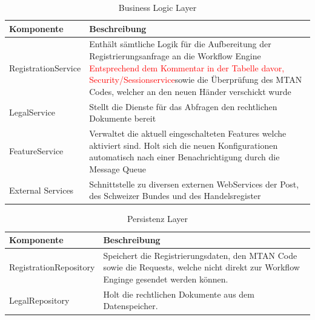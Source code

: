 \begin{table}[H]
	\centering
	\caption{Business Logic Layer}
	\begin{tabular}{ | p{4cm} | p{12cm} | }
		\toprule
		{\textbf{Komponente}} & {\textbf{Beschreibung}} \\
		\midrule
		RegistrationService &  Enthält sämtliche Logik für die Aufbereitung der Registrierungsanfrage an die Workflow Engine \textcolor{red}{Entsprechend dem Kommentar in der Tabelle davor, Security/Sessionservice}sowie die Überprüfung des MTAN Codes, welcher an den neuen Händer verschickt wurde\\ \hline
		LegalService &  Stellt die Dienste für das Abfragen den rechtlichen Dokumente bereit \\ \hline
		FeatureService &  Verwaltet die aktuell eingeschalteten Features welche aktiviert sind. Holt sich die neuen Konfigurationen automatisch nach einer Benachrichtigung durch die Message Queue \\ \hline
		External Services & Schnittstelle zu diversen externen WebServices der Post, des Schweizer Bundes und des Handelsregister \\
		\bottomrule
	\end{tabular}
\end{table}

\begin{table}[H]
	\centering
	\caption{Persistenz Layer}
	\begin{tabular}{ | p{4cm} | p{12cm} | }
		\toprule
		{\textbf{Komponente}} & {\textbf{Beschreibung}} \\
		\midrule
		RegistrationRepository &  Speichert die Registrierungsdaten, den MTAN Code sowie die Requests, welche nicht direkt zur Workflow Enginge gesendet werden können. \\ \hline
		LegalRepository &  Holt die rechtlichen Dokumente aus dem Datenspeicher. \\
		\bottomrule
	\end{tabular}
\end{table}

